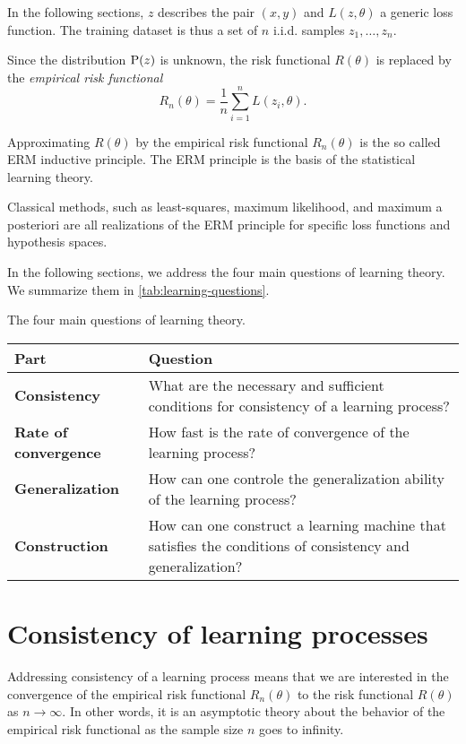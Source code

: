 In the following sections, $z$ describes the pair $(x, y)$ and $L(z, \theta)$ a generic loss
function.  The training dataset is thus a set of $n$ i.i.d. samples $z_1, \dots, z_n$.

Since the distribution $\operatorname{P}(z)$ is unknown, the risk functional $R(\theta)$ is replaced by
the \emph{empirical risk functional}
\begin{equation}
  \label{eq:empirical-risk}
  R_n(\theta) = \frac{1}{n} \sum_{i=1}^n L(z_i, \theta)\text{.}
\end{equation}

Approximating $R(\theta)$ by the empirical risk functional $R_n(\theta)$ is the so called
ERM inductive principle.  The ERM principle is the basis of the statistical learning
theory.

Classical methods, such as least-squares, maximum likelihood, and maximum a posteriori are
all realizations of the ERM principle for specific loss functions and hypothesis spaces.

In the following sections, we address the four main questions of learning theory.  We
summarize them in \cref{tab:learning-questions}.

\begin{tablebox}[label=tab:learning-questions]{The four main questions of learning theory.}
  \begin{tabularx}{\textwidth}{@{}lX@{}}
    \toprule
    Part & Question \\
    \midrule
    \textbf{Consistency} &
      What are the necessary and sufficient conditions for consistency of a learning process? \\
    \textbf{Rate of convergence} &
      How fast is the rate of convergence of the learning process? \\
    \textbf{Generalization} &
      How can one controle the generalization ability of the learning process? \\
    \textbf{Construction} &
      How can one construct a learning machine that satisfies the conditions of consistency and generalization? \\
    \bottomrule
  \end{tabularx}
\end{tablebox}

\section{Consistency of learning processes}

Addressing consistency of a learning process means that we are interested in the
convergence of the empirical risk functional $R_n(\theta)$ to the risk functional
$R(\theta)$ as $n \to \infty$.  In other words, it is an asymptotic theory about the
behavior of the empirical risk functional as the sample size $n$ goes to infinity.

